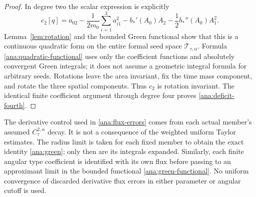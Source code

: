 \begin{proof}
In degree two the scalar expression is explicitly
\begin{equation}
 c_2[q]=a_{02}
       -\frac1{2m_0}\sum_{i=1}^3a_{i1}^2
       -b_*'(A_0)A_2-\frac12b_*''(A_0)A_1^2.
 \label{ana:quadratic-functional}
\end{equation}
Lemma~\ref{lem:rotation} and the bounded Green functional show that
this is a continuous quadratic form on the entire formal seed space
$\mathscr T_{\tau,\alpha}$.  Formula \eqref{ana:quadratic-functional}
uses only the coefficient functions and absolutely convergent Green
integrals; it does not assume a geometric integral formula for
arbitrary seeds.  Rotations leave the area invariant, fix the time
mass component, and rotate the three spatial components.  Thus $c_2$
is rotation invariant.  The identical finite coefficient argument
through degree four proves \eqref{ana:deficit-fourth}.
\end{proof}

\begin{remark}
\label{ana:order-of-limits}
The derivative control used in \eqref{ana:flux-errors} comes from each
actual member's assumed $C^{2,\alpha}_\tau$ decay.  It is not a
consequence of the weighted uniform Taylor estimates.  The radius
limit is taken for each fixed member to obtain the exact identity
\eqref{ana:green}; only then are its integrals expanded.  Similarly,
each finite angular type coefficient is identified with its own flux
before passing to an approximant limit in the bounded functional
\eqref{ana:green-functional}.  No uniform convergence of discarded
derivative flux errors in either parameter or angular cutoff is used.
\end{remark}
